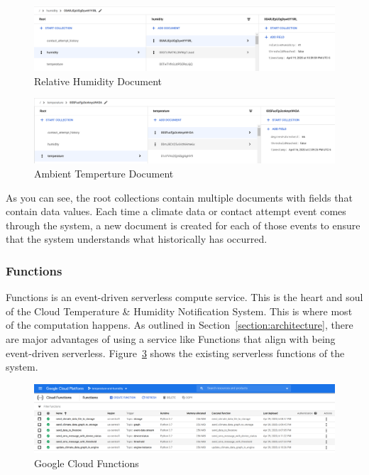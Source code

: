 \documentclass{article}
\begin{document}
\begin{figure}[H]
	\center
	\includegraphics[width=\textwidth]{images/database-humidity.png}
	\caption{Relative Humidity Document}
	\label{fig:humidity}
\end{figure}

\begin{figure}[H]
	\center
	\includegraphics[width=\textwidth]{images/database-temperature.png}
	\caption{Ambient Temperture Document}
	\label{fig:temperature}
\end{figure}

As you can see, the root collections contain multiple documents with fields that contain data values. Each time a climate data or contact attempt event comes through the system, a new document is created for each of those events to ensure that the system understands what historically has occurred.

\subsubsection{Functions}
\label{section:functions}
Functions is an event-driven serverless compute service. This is the heart and soul of the Cloud Temperature \& Humidity Notification System. This is where most of the computation happens. As outlined in Section~\ref{section:architecture}, there are major advantages of using a service like Functions that align with being event-driven serverless. Figure~\ref{fig:functions} shows the existing serverless functions of the system.\\

\begin{figure}[H]
	\center
	\includegraphics[width=\textwidth]{images/serverless-functions.png}
	\caption{Google Cloud Functions}
	\label{fig:functions}
\end{figure}
\end{document}
